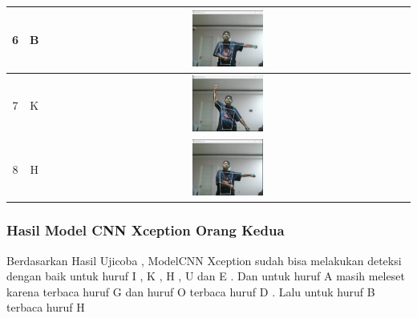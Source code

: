 \begin{table}[h]
\begin{tabular}{|c|c|c|}
		\hline
		6 & B & \includegraphics[width=0.2\textwidth]{gambar/bener/HurufB_ModelCNNResNet50V2_Fachry.png} \\
		\hline
		7 & K & \includegraphics[width=0.2\textwidth]{gambar/bener/HurufK_ModelCNNResNet50V2_Fachry.png} \\
		\hline
		8 & H & \includegraphics[width=0.2\textwidth]{gambar/bener/HurufH_ModelCNNResNet50V2_Fachry.png} \\
		\hline
		\end{tabular}
		\end{table}


\subsubsection*{Hasil Model CNN Xception Orang Kedua}

Berdasarkan Hasil Ujicoba  , ModelCNN Xception sudah bisa melakukan deteksi dengan baik untuk huruf I , K , H , U dan E . Dan untuk huruf A masih meleset karena terbaca huruf G dan huruf O terbaca huruf D . Lalu untuk huruf B terbaca huruf H


